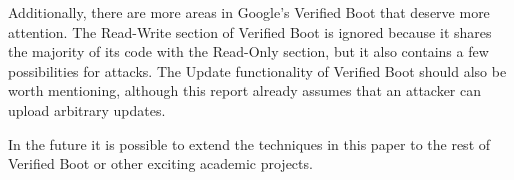 \documentclass[../report.tex]{subfiles}
\begin{document}
Additionally, there are more areas in Google's Verified Boot that
deserve more attention. 
The Read-Write section of Verified Boot is ignored because it shares the
majority of its code with the Read-Only section, but it also contains a few
possibilities for attacks.
The Update functionality of Verified Boot should also be worth mentioning,
although this report already assumes that an attacker can upload arbitrary
updates.

In the future it is possible to extend the techniques in this paper to the rest of
Verified Boot or other exciting academic projects.
\end{document}
